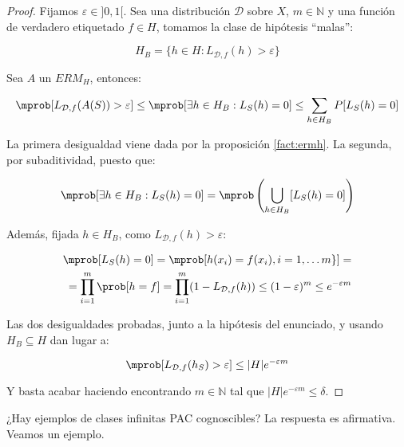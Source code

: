   \begin{proof}
  Fijamos $\varepsilon \in ]0,1[$. Sea una distribución $\mathcal{D}$ sobre $X$, $m\in \mathbb{N}$ y una función de verdadero 
  etiquetado $f\in H$, tomamos la clase de hipótesis ``malas'':

  \[H_B = \{h\in H: L_{\mathcal{D},f}(h) > \varepsilon\}\]

  Sea $A$ un $ERM_{H}$, entonces:

  \[\mprob [L_{\mathcal{D},f}(A(S)) > \varepsilon] \le \mprob 
  [\exists h\in H_B : L_S(h) = 0] \le \sum_{h\in H_B} P [L_S(h) = 0] \]

  La primera desigualdad viene dada por la proposición \ref{fact:ermh}. La segunda, por subaditividad, puesto que:
  
  \[\mprob [\exists h\in H_B : L_S(h) = 0] = \mprob \left(\underset{h\in H_B}{\bigcup} [L_S(h) = 0]\right)\]

  Además, fijada $h\in H_B$, como $L_{\mathcal{D},f}(h) > \varepsilon$:

  \begin{align*}
  \mprob[L_S(h) = 0] = \mprob[h(x_i) = f(x_i), i =1,\ldots m\}] =\\
  = \prod_{i=1}^m \prob[h = f] = \prod_{i=1}^m (1 - L_{\mathcal{D},f}(h)) \le (1-\varepsilon)^m \le e^{-\varepsilon m}
  \end{align*}


  Las dos desigualdades probadas, junto a la hipótesis del enunciado, y usando $H_B \subseteq H$ dan lugar a:

  \[\mprob[L_{\mathcal{D},f}(h_S) > \varepsilon] \le |H|e^{-\varepsilon m}\]
  
  Y basta acabar haciendo encontrando $m\in \mathbb{N}$ tal que $|H|e^{-\varepsilon m} \le \delta$.
  \end{proof}

¿Hay ejemplos de clases infinitas PAC cognoscibles? La respuesta es afirmativa. Veamos un ejemplo.

